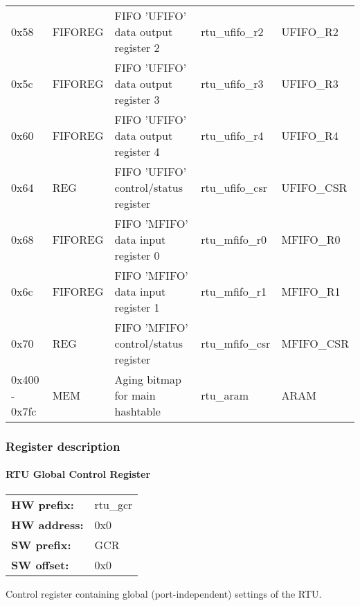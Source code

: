 {\begin{tabular}{|l|l|l|l|l|}
0x58& FIFOREG & FIFO 'UFIFO' data output register 2 & rtu\_ufifo\_r2 & UFIFO\_R2\\
0x5c& FIFOREG & FIFO 'UFIFO' data output register 3 & rtu\_ufifo\_r3 & UFIFO\_R3\\
0x60& FIFOREG & FIFO 'UFIFO' data output register 4 & rtu\_ufifo\_r4 & UFIFO\_R4\\
0x64& REG & FIFO 'UFIFO' control/status register & rtu\_ufifo\_csr & UFIFO\_CSR\\
0x68& FIFOREG & FIFO 'MFIFO' data input register 0 & rtu\_mfifo\_r0 & MFIFO\_R0\\
0x6c& FIFOREG & FIFO 'MFIFO' data input register 1 & rtu\_mfifo\_r1 & MFIFO\_R1\\
0x70& REG & FIFO 'MFIFO' control/status register & rtu\_mfifo\_csr & MFIFO\_CSR\\
0x400 - 0x7fc& MEM & Aging bitmap for main hashtable & rtu\_aram & ARAM\\
\hline
\end{tabular}
}

\subsubsection{Register description}
\paragraph*{RTU Global Control Register}\vspace{12pt}

\begin{tabular}{l l }
{\bf HW prefix:}  & rtu\_gcr\\
{\bf HW address:}  & 0x0\\
{\bf SW prefix:}  & GCR\\
{\bf SW offset:}  & 0x0\\
\end{tabular}

\vspace{12pt}
Control register containing global (port-independent) settings of the RTU.

